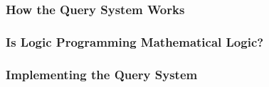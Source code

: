             \subsubsection{How the Query System Works}
            \subsubsection{Is Logic Programming Mathematical Logic?}
            \subsubsection{Implementing the Query System}

